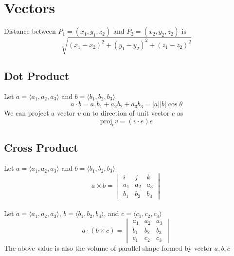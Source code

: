 \documentclass[a4paper,12pt]{article}
\begin{document}
\section{Vectors}
Distance between $P_1=(x_1,y_1,z_2)$ and $P_2=(x_2,y_2,z_2)$ is
$$\sqrt{(x_1-x_2)^2+(y_1-y_2)^2+(z_1-z_2)^2}$$

\subsection{Dot Product}
Let $a=\langle a_1,a_2,a_3\rangle$ and $b=\langle b_1,b_2,b_3\rangle$
$$a\cdot b=a_1b_1+a_2b_2+a_3b_3=|a||b|\cos\theta$$
We can project a vector $v$ on to direction of unit vector $e$ as
$$\text{proj}_e v=(v\cdot e)e$$

\subsection{Cross Product}
Let $a=\langle a_1,a_2,a_3\rangle$ and $b=\langle b_1,b_2,b_3\rangle$
$$a\times b=\begin{vmatrix}
 i & j & k \\
 a_1 & a_2 & a_3 \\
 b_1 & b_2 & b_3
\end{vmatrix}$$
\\
Let $a=\langle a_1,a_2,a_3\rangle$, $b=\langle b_1,b_2,b_3\rangle$, and $c=\langle c_1,c_2,c_3\rangle$
$$a\cdot(b\times c)=\begin{vmatrix}
a_1 & a_2 & a_3 \\
b_1 & b_2 & b_3 \\
c_1 & c_2 & c_3
\end{vmatrix}$$
The above value is also the volume of parallel shape formed by vector $a, b, c$
\end{document}
